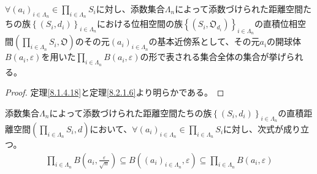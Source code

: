 \documentclass[dvipdfmx]{jsarticle}
\begin{document}
\begin{thm}\label{8.2.1.21}
$\forall\left( a_{i} \right)_{i \in \varLambda_{n}} \in \prod_{i \in \varLambda_{n}} S_{i}$に対し、添数集合$\varLambda_{n}$によって添数づけられた距離空間たちの族$\left\{ \left( S_{i},d_{i} \right) \right\}_{i \in \varLambda_{n}}$における位相空間の族$\left\{ \left( S_{i},\mathfrak{O}_{d_{i}} \right) \right\}_{i \in \varLambda_{n}}$の直積位相空間$\left( \prod_{i \in \varLambda_{n}} S_{i},\mathfrak{O} \right)$のその元$\left( a_{i} \right)_{i \in \varLambda_{n}}$の基本近傍系として、その元$a_{i}$の開球体$B\left( a_{i},\varepsilon \right)$を用いた$\prod_{i \in \varLambda_{n}} {B\left( a_{i},\varepsilon \right)}$の形で表される集合全体の集合が挙げられる。
\end{thm}
\begin{proof} 定理\ref{8.1.4.18}と定理\ref{8.2.1.6}より明らかである。
\end{proof}
\begin{thm}\label{8.2.1.22}
添数集合$\varLambda_{n}$によって添数づけられた距離空間たちの族$\left\{ \left( S_{i},d_{i} \right) \right\}_{i \in \varLambda_{n}}$の直積距離空間$\left( \prod_{i \in \varLambda_{n}} S_{i},d \right)$において、$\forall\left( a_{i} \right)_{i \in \varLambda_{n}} \in \prod_{i \in \varLambda_{n}} S_{i}$に対し、次式が成り立つ。
\begin{align*}
\prod_{i \in \varLambda_{n}} {B\left( a_{i},\frac{\varepsilon}{\sqrt{n}} \right)} \subseteq B\left( \left( a_{i} \right)_{i \in \varLambda_{n}},\varepsilon \right) \subseteq \prod_{i \in \varLambda_{n}} {B\left( a_{i},\varepsilon \right)}
\end{align*}
\end{thm}
\end{document}
